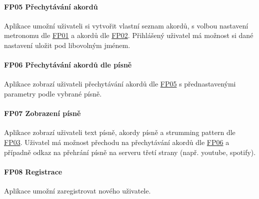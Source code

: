 \noindent \begin{minipage}{\textwidth}
    \paragraph{FP05 Přechytávání akordů} \label{FP05}
    \begin{smallindent}{}
        Aplikace umožní uživateli si vytvořit vlastní seznam akordů, s volbou nastavení metronomu dle \hyperref[FP01]{FP01} a akordů dle \hyperref[FP02]{FP02}.
        Přihlášený uživatel má možnost si dané nastavení uložit pod libovolným jménem.
    \end{smallindent}
\end{minipage}

\noindent \begin{minipage}{\textwidth}
    \paragraph{FP06 Přechytávání akordů dle písně} \label{FP06} 
    \begin{smallindent}{}
        Aplikace zobrazí uživateli přechytávání akordů dle \hyperref[FP05]{FP05} s přednastavenými parametry podle vybrané písně.
    \end{smallindent}
\end{minipage}


\noindent \begin{minipage}{\textwidth}
    \paragraph{FP07 Zobrazení písně} \label{FP07}
    \begin{smallindent}{}
        Aplikace zobrazí uživateli text písně, akordy písně a strumming pattern dle \hyperref[FP03]{FP03}. Uživatel má možnost přechodu na přechytávání akordů dle \hyperref[FP06]{FP06} a případně odkaz na přehrání písně na serveru třetí strany (např. youtube, spotify).
    \end{smallindent}
\end{minipage}

\noindent \begin{minipage}{\textwidth}
    \paragraph{FP08 Registrace} \label{FP08}
    \begin{smallindent}{}
        Aplikace umožní zaregistrovat nového uživatele.
    \end{smallindent}
\end{minipage}

